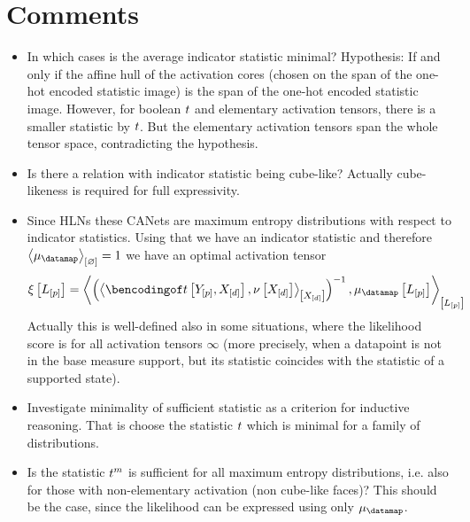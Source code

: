 \documentclass[aps,onecolumn,nofootinbib,pra]{article}
\begin{document}
    \section{Comments}

    \begin{itemize}
        \item In which cases is the average indicator statistic minimal?
        Hypothesis: If and only if the affine hull of the activation cores (chosen on the span of the one-hot encoded statistic image) is the span of the one-hot encoded statistic image.
        However, for boolean $t$ and elementary activation tensors, there is a smaller statistic by $t$.
        But the elementary activation tensors span the whole tensor space, contradicting the hypothesis.
        \item Is there a relation with indicator statistic being cube-like?
        Actually cube-likeness is required for full expressivity.
        \item Since HLNs these CANets are maximum entropy distributions with respect to indicator statistics.
        Using that we have an indicator statistic and therefore $\contraction{\datamean}=1$ we have an optimal activation tensor
        \begin{align*}
            \acttensorat{\selvariableof{[\seldim]}}
            = \contractionof{
                \left(\contractionof{\bencsstatwith,\basemeasurewith}{\shortcatvariables}\right)^{-1},\datameanat{\selvariableof{[\seldim]}}
            }{\selvariableof{[\seldim]}}
        \end{align*}
        Actually this is well-defined also in some situations, where the likelihood score is for all activation tensors $\infty$ (more precisely, when a datapoint is not in the base measure support, but its statistic coincides with the statistic of a supported state).
        \item Investigate minimality of sufficient statistic as a criterion for inductive reasoning.
        That is choose the statistic $t$ which is minimal for a family of distributions.
        \item Is the statistic $t^{m}$ is sufficient for all maximum entropy distributions, i.e. also for those with non-elementary activation (non cube-like faces)?
        This should be the case, since the likelihood can be expressed using only $\datamean$.
    \end{itemize}

    
    
\end{document}
